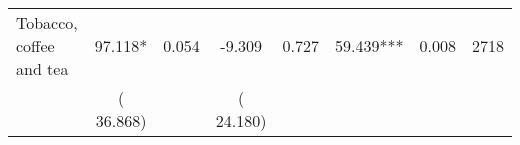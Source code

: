 \begin{tabular}{l*{7}{c}}
 Tobacco, coffee and tea       &             97.118*       &        0.054  &             -9.309       &        0.727  &             59.439***       &              0.008 &  2718 \\ 
                       &       (      36.868)             &                               &       (      24.180)                     &                               &                                               &                                &                      \\ 

\hline \end{tabular}